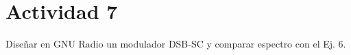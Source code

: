 \section{Actividad 7}

Diseñar en GNU Radio un modulador DSB-SC y comparar espectro con el Ej. 6.  
